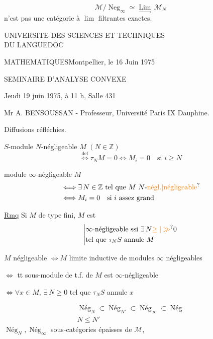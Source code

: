 \[
\mathcal M/\operatorname{Neg}_{\infty}\simeq\underset{\longrightarrow}{\operatorname{Lim}}\,\mathcal M_N
\]
n'est pas une catégorie à \uline{$\operatorname{lim}$} filtrantes exactes.

UNIVERSITE DES SCIENCES ET TECHNIQUES\\
DU LANGUEDOC

MATHEMATIQUES\hfill Montpellier, le 16 Juin 1975

SEMINAIRE D'ANALYSE CONVEXE

Jeudi 19 juin 1975, à 11 h, Salle 431

Mr A. BENSOUSSAN - Professeur, Université Paris IX Dauphine.

Diffusions réfléchies.

$S$-module $N$-négligeable $M$ \quad $(N\in\mathbb Z)$
\[
\overset{\mathrm{def}}{\Longleftrightarrow}\tau_N M=0
\Longleftrightarrow M_i=0\quad\text{si }i\geq N
\]

module $\infty$-négligeable $M$
\[
\begin{aligned}
&\Longleftrightarrow \exists\,N\in\mathbb Z\ \text{tel que }M\ \text{$N$-\unsure{négl.|négligeable}}\\
&\Longleftrightarrow M_i=0\quad\text{si }i\text{ assez grand}
\end{aligned}
\]

\uline{Rmq} Si $M$ de type fini, $M$ est
\[
\left|\begin{aligned}
&\infty\text{-négligeable ssi }\exists\,N\unsure{\geq|\gg}0\\
&\text{tel que }\tau_N S\text{ annule }M
\end{aligned}\right.
\]

$M$ négligeable $\Longleftrightarrow M$ limite inductive de modules $\infty$ négligeables

$\Longleftrightarrow$ tt sous-module de t.f. de $M$ est $\infty$-négligeable

$\Longleftrightarrow\forall x\in M,\ \exists\,N\geq 0$ tel que $\tau_N S$ annule $x$

\[
\begin{gathered}
\operatorname{Nég}_N\subset\operatorname{Nég}_{N'}\subset\operatorname{Nég}_\infty\subset\operatorname{Nég}\\
N\leq N'
\end{gathered}
\]
$\operatorname{Nég}_N,\operatorname{Nég}_\infty$ sous-catégories épaisses de $\mathcal M$,

